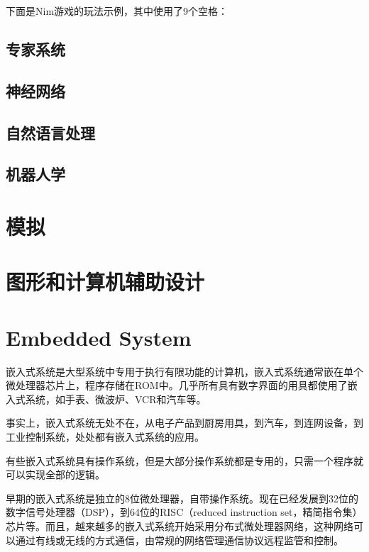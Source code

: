 下面是Nim游戏的玩法示例，其中使用了9个空格：






\section{专家系统}




\section{神经网络}




\section{自然语言处理}




\section{机器人学}





\chapter{模拟}




\chapter{图形和计算机辅助设计}





\chapter{Embedded System}

嵌入式系统是大型系统中专用于执行有限功能的计算机，嵌入式系统通常嵌在单个微处理器芯片上，程序存储在ROM中。几乎所有具有数字界面的用具都使用了嵌入式系统，如手表、微波炉、VCR和汽车等。

事实上，嵌入式系统无处不在，从电子产品到厨房用具，到汽车，到连网设备，到工业控制系统，处处都有嵌入式系统的应用。

有些嵌入式系统具有操作系统，但是大部分操作系统都是专用的，只需一个程序就可以实现全部的逻辑。

早期的嵌入式系统是独立的8位微处理器，自带操作系统。现在已经发展到32位的数字信号处理器（DSP），到64位的RISC（reduced instruction set，精简指令集）芯片等。而且，越来越多的嵌入式系统开始采用分布式微处理器网络，这种网络可以通过有线或无线的方式通信，由常规的网络管理通信协议远程监管和控制。

